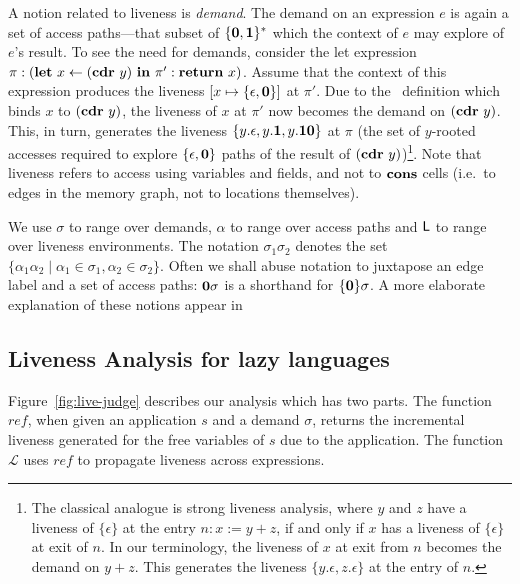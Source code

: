 \documentclass[9pt]{sigplanconf}
\begin{document}
A  notion related  to  liveness is  {\em  demand}.  The  demand on  an
expression  $e$  is again  a  set  of  access paths---that  subset  of
$\{\mathbf{0},\mathbf{1}\}^\ast$ which  the context of $e$ may  explore of $e$'s
result.   To see  the need  for demands,  consider the  let expression
$\pi:(\mbox{$\mathbf{ let}$}~x\leftarrow (\mbox{$\mathbf{cdr}$}~y)~\mbox{$\mathbf{ in}$}~ \pi':\mbox{$\mathbf{ return}$}~x)$. Assume that the
context of  this expression produces the liveness  $[x \mapsto \lbrace
  \epsilon, \mathbf{0}  \rbrace]$ at $\pi'$.   Due to the  \LET\ definition
which  binds $x$  to $(\mbox{$\mathbf{cdr}$}~y)$,  the liveness  of $x$  at  $\pi'$ now
becomes  the  demand on  $(\mbox{$\mathbf{cdr}$}~y)$.   This,  in  turn, generates  the
liveness $\lbrace y.\epsilon,  y.\mathbf{1}, y.\mathbf{1}\mathbf{0} \rbrace$ at $\pi$
(the set of $y$-rooted accesses required to explore $\lbrace \epsilon,
\mathbf{0}  \rbrace$  paths  of  the  result  of  $(\mbox{$\mathbf{cdr}$}~y)$)\footnote{The
  classical analogue  is strong liveness  analysis, where $y$  and $z$
  have  a  liveness  of  $\lbrace\epsilon\rbrace$  at  the  entry  $n:
  x:=y+z$,    if   and    only   if    $x$   has    a    liveness   of
  $\lbrace\epsilon\rbrace$ at  exit of  $n$.  In our  terminology, the
  liveness of $x$  at exit from $n$ becomes the  demand on $y+z$. This
  generates the  liveness $\lbrace y.\epsilon,  z.\epsilon \rbrace$ at
  the entry of $n$.}.
Note that  liveness refers to  access using variables and  fields, and
not  to $\mbox{$\mathbf{cons}$}$  cells (i.e.\  to edges  in the  memory graph,  not to
locations themselves).

We use $\sigma$  to range over demands, $\alpha$  to range over access
paths  and $\mathsf{L}$ to  range over  liveness environments.   The notation
$\sigma_1\sigma_2$  denotes  the  set $\lbrace  \alpha_1\alpha_2  \mid
\alpha_1 \in \sigma_1, \alpha_2  \in \sigma_2\rbrace$.  Often we shall
abuse notation to  juxtapose an edge label and a  set of access paths:
$\mathbf{0}\sigma$ is a shorthand for $\lbrace\mathbf{0}\rbrace\sigma$. A more
elaborate explanation of these notions appear in \cite{asati14lgc}


\subsection{Liveness Analysis for lazy languages}

Figure~\ref{fig:live-judge}  describes  our  analysis  which  has  two
parts. The function $\mathit{ref}$,  when given an application $s$ and
a demand $\sigma$, returns  the incremental liveness generated for the
free  variables   of  $s$  due  to  the   application.   The  function
$\mathcal{L}$  uses   $\mathit{ref}$  to  propagate   liveness  across
expressions.
\end{document}
